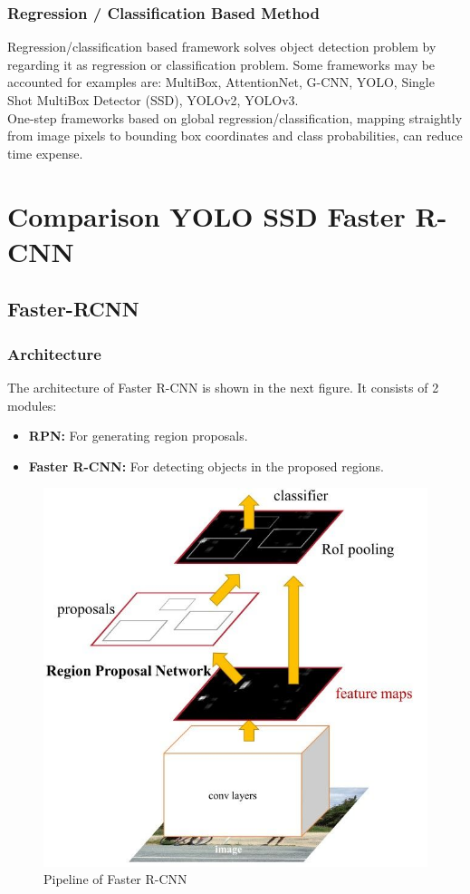         \subsubsection{Regression / Classification Based Method}
            Regression/classification based framework solves object detection problem by regarding it as regression or classification problem. Some frameworks may be accounted for examples are: MultiBox, AttentionNet, G-CNN, YOLO, Single Shot MultiBox Detector (SSD), YOLOv2, YOLOv3. \\
            \vspace{3mm}
            One-step frameworks based on global regression/classification, mapping straightly from image pixels to bounding box coordinates and class probabilities, can reduce time expense. \\

\section{Comparison YOLO SSD Faster R-CNN}

    \subsection{Faster-RCNN}
        \subsubsection{Architecture}
            The architecture of Faster R-CNN is shown in the next figure. It consists of 2 modules:
            \begin{itemize}
                \item \textbf{RPN:} For generating region proposals. 
                \item \textbf{Faster R-CNN:} For detecting objects in the proposed regions.
            \end{itemize}
            \begin{figure}[H]
                \centering
                \includegraphics[width=0.6\linewidth]{img/R-CNN.png}
                \caption{Pipeline of Faster R-CNN}
            \end{figure}
